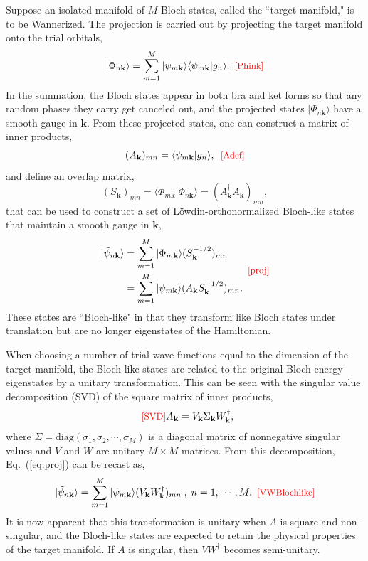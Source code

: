 \documentclass[galley,aps,pra,10pt,amsmath,amssymb,
    superscriptaddress,nofootinbib,longbibliography]{revtex4-2}
\def\Red#1{\textcolor{red}{#1}}
\newcounter{comm}
\newcommand{\eqlab}[1]{\Red{\hbox{\small\;\;[#1]}}\label{eq:#1}}
\newcommand{\eqlab}[1]{\label{eq:#1}}
\newcommand{\eq}[1]{Eq.~(\ref{eq:#1})}
\begin{document}
Suppose an isolated manifold of $M$ Bloch states, called the ``target manifold," is to be Wannerized. The projection is carried out by projecting the target manifold onto the trial orbitals,
\begin{equation}
    |\Phi_{n \mathbf{k}} \rangle = \sum_{m=1}^M |\psi_{m\mathbf{k}} \rangle \langle \psi_{m\mathbf{k}} | g_n \rangle .
\eqlab{Phink}
\end{equation}
In the summation, the Bloch states appear in both bra and ket forms so that any random phases they carry get canceled out, and the projected states $|\Phi_{n \mathbf{k}} \rangle$ have a smooth gauge in $\mathbf{k}$. From these projected states, one can construct a matrix of inner products, 
\begin{equation}
(A_{\mathbf{k}})_{mn} = \langle \psi_{m\mathbf{k}} | g_n \rangle,
\eqlab{Adef}
\end{equation}
and define an overlap matrix,
\begin{equation}
(S_{\mathbf{k}})_{mn} = \langle \Phi_{m\mathbf{k}} | \Phi_{n\mathbf{k}} \rangle = (A_{\mathbf{k}}^{\dagger} A_{\mathbf{k}})_{mn},
\end{equation}
that can be used to construct a set of Löwdin-ortho\-nor\-malized Bloch-like states that maintain a smooth gauge in $\mathbf{k}$,
\begin{equation}
    \begin{split}
    |\tilde{\psi}_{n\mathbf{k}} \rangle &= \sum_{m=1}^M |\Phi_{m\mathbf{k}} \rangle (S_{\mathbf{k}}^{-1/2})_{mn} \\&= \sum_{m=1}^M |\psi_{m\mathbf{k}} \rangle (A_{\mathbf{k}}S_{\mathbf{k}}^{-1/2})_{mn} .
    \end{split}
    \eqlab{proj}
\end{equation}
These states are ``Bloch-like" in that they transform like Bloch states under translation but are no longer eigenstates of the Hamiltonian.

When choosing a number of trial wave functions equal to the dimension of the target manifold, the Bloch-like states are related to the original Bloch energy eigenstates by a unitary transformation. This can be seen with the singular value decomposition (SVD) of the square matrix of inner products, 
\begin{equation}
\eqlab{SVD}
    A_{\mathbf{k}} = V_{\mathbf{k}} \Sigma_{\mathbf{k}} W_{\mathbf{k}}^{\dagger} ,
\end{equation} 
where $\Sigma = \text{diag}(\sigma_1, \sigma_2, \cdots, \sigma_M)$ is a diagonal matrix of nonnegative singular values and $V$ and $W$ are unitary $M\times M$ matrices. From this decomposition, \eq{proj} can be recast as,
\begin{equation}
|\tilde{\psi}_{n\mathbf{k}} \rangle = \sum_{m=1}^M |\psi_{m\mathbf{k}} \rangle (V_{\mathbf{k}}W_{\mathbf{k}}^{\dagger})_{mn} \;,\;n=1,\cdots,M.
\eqlab{VWBlochlike}
\end{equation}
It is now apparent that this transformation is unitary when $A$ is square and non-singular, and the Bloch-like states are expected to retain the physical properties of the target manifold. If $A$ is singular, then $VW^{\dagger}$ becomes semi-unitary.
\end{document}
